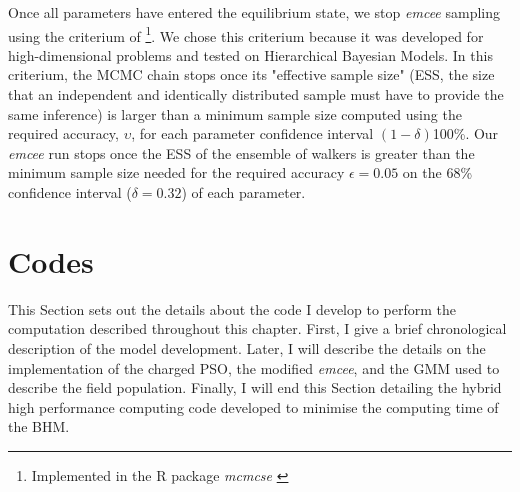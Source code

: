 Once all parameters have entered the equilibrium state, we stop \emph{emcee} sampling using the criterium of \citet{Gong2016} \footnote{Implemented in the R package \emph{mcmcse} \citep{mcmcse}}. We chose this criterium because it was developed for high-dimensional problems and tested on Hierarchical Bayesian Models. In this criterium, the MCMC chain stops once its "effective sample size" (ESS, the size that an independent and identically distributed sample must have to provide the same inference) is larger than a minimum sample size computed using the required accuracy, $\upsilon$, for each parameter confidence interval $(1-\delta)$100\%. Our \emph{emcee} run stops once the ESS of the ensemble of walkers is greater than the minimum sample size needed for the required accuracy $\epsilon = 0.05$ on the 68\% confidence interval ($\delta = 0.32$) of each parameter.


\section{Codes}
\label{sect:code}
This Section sets out the details about the code I develop to perform the computation described throughout this chapter. First, I give a brief chronological description of the model development. Later, I will describe the details on the implementation of the charged PSO, the modified \emph{emcee}, and the GMM used to describe the field population. Finally, I will end this Section detailing the hybrid high performance computing code developed to minimise the computing time of the BHM.

